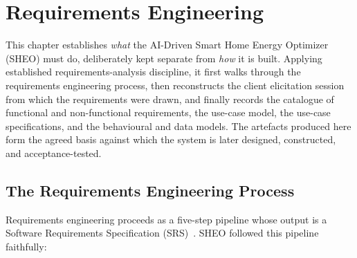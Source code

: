 \chapter{Requirements Engineering}

This chapter establishes \emph{what} the AI-Driven Smart Home Energy Optimizer
(SHEO) must do, deliberately kept separate from \emph{how} it is built. Applying
established requirements-analysis discipline, it first walks through
the requirements engineering process, then reconstructs the client elicitation
session from which the requirements were drawn, and finally records the catalogue of
functional and non-functional requirements, the use-case model, the use-case
specifications, and the behavioural and data models. The artefacts produced here form
the agreed basis against which the system is later designed, constructed, and
acceptance-tested.

\section{The Requirements Engineering Process}
\label{sec:req-process}

Requirements engineering proceeds as a five-step pipeline whose output is a
Software Requirements Specification (SRS)~\cite{ieee29148}. SHEO followed this pipeline faithfully:

